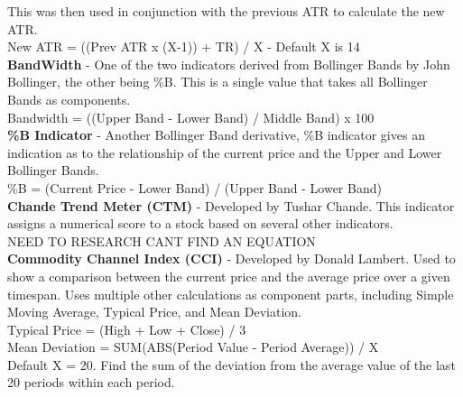 \documentclass[12pt,a4paper]{article}
\begin{document}
\noindent
This was then used in conjunction with the previous ATR to calculate the new ATR.\\

\noindent
New ATR = ((Prev ATR x (X-1)) + TR) / X - Default X is 14 \\

\iffalse
[]
\fi

\noindent
\textbf{BandWidth}  - One of the two indicators derived from Bollinger Bands by John Bollinger, the other being \%B. This is a single value that takes all Bollinger Bands as components.\\

\noindent
Bandwidth = ((Upper Band - Lower Band) / Middle Band) x 100 \\

\iffalse
[]
\fi

\noindent
\textbf{\%B Indicator} - Another Bollinger Band derivative, \%B indicator gives an indication as to the relationship of the current price and the Upper and Lower Bollinger Bands. \\

\noindent
\%B = (Current Price - Lower Band) / (Upper Band - Lower Band)\\

\iffalse
[]
\fi

\noindent
\textbf{Chande Trend Meter (CTM)} - Developed by Tushar Chande. This indicator assigns a numerical score to a stock based on several other indicators.\\

NEED TO RESEARCH CANT FIND AN EQUATION\\

\iffalse
[]
\fi

\noindent
\textbf{Commodity Channel Index (CCI)} - Developed by Donald Lambert. Used to show a comparison between the current price and the average price over a given timespan. Uses multiple other calculations as component parts, including Simple Moving Average, Typical Price, and Mean Deviation.\\

\noindent
Typical Price = (High + Low + Close) / 3\\

\noindent
Mean Deviation = SUM(ABS(Period Value - Period Average)) / X\\
Default X = 20. Find the sum of the deviation from the average value of the last 20 periods within each period. \\
\end{document}
